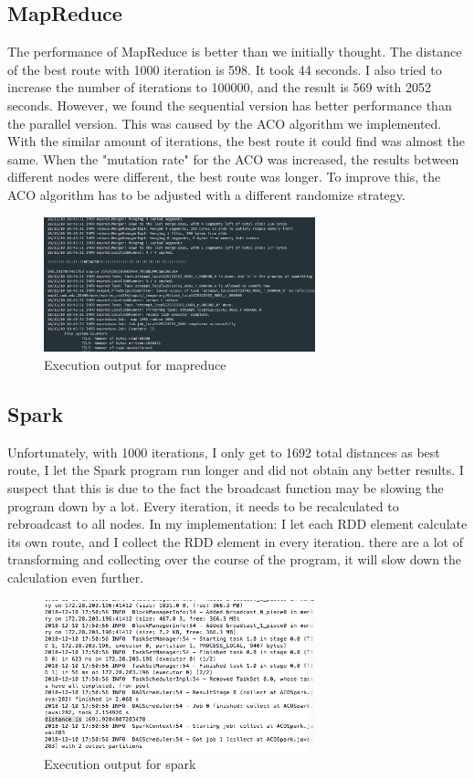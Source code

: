 \documentclass[11pt, letterpaper]{article}
\begin{document}
	\subsection{MapReduce}
	The performance of MapReduce is better than we initially thought. The distance of the best route with 1000 iteration is 598. It took 44 seconds. I also tried to increase the number of iterations to 100000, and the result is 569 with 2052 seconds. However, we found the sequential version has better performance than the parallel version. This was caused by the ACO algorithm we implemented. With the similar amount of iterations, the best route it could find was almost the same. When the "mutation rate" for the ACO was increased, the results between different nodes were different, the best route was longer. To improve this, the ACO algorithm has to be adjusted with a different randomize strategy. 
	
 	\begin{figure}[H]
		\centering
		\includegraphics[width=0.7\textwidth]{mapout}
		\caption{Execution output for mapreduce}
	\end{figure}	
	
	\subsection{Spark}
	
	Unfortunately, with 1000 iterations, I only get to 1692 total distances as best route, I let the Spark program run longer and did not obtain any better results. I suspect that this is due to the fact the broadcast function may be slowing the program down by a lot. Every iteration, it needs to be recalculated to rebroadcast to all nodes. In my implementation: I let each RDD element calculate its own route, and I collect the RDD element in every iteration. there are a lot of transforming and collecting over the course of the program, it will slow down the calculation even further.
	
	\begin{figure}[H]
		\centering
		\includegraphics[width=0.7\textwidth]{sparkout}
		\caption{Execution output for spark}
	\end{figure}
	
\end{document}
